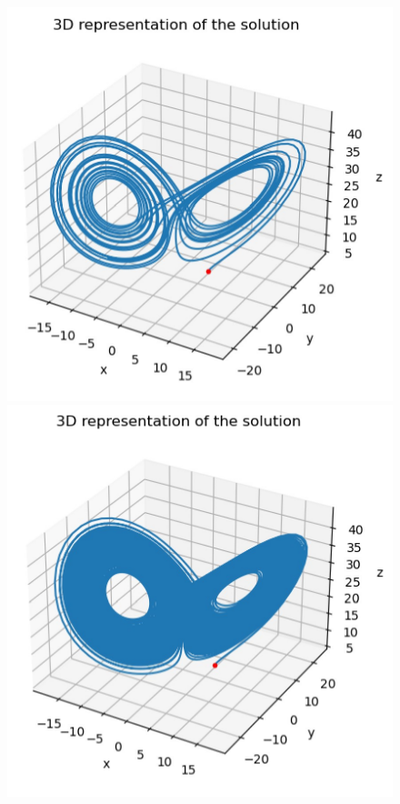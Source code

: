 \begin{figure}[H]       
	\begin{minipage}[t]{0.48\linewidth}
		\centering
		\includegraphics[width=\linewidth]{"images/parareal/lorenz_exact_3D.jpg"}
	\end{minipage} \hfill
	\begin{minipage}[t]{0.48\linewidth}
		\centering
		\includegraphics[width=\linewidth]{"images/parareal/lorenz_exact_3D_T200.jpg"}
	\end{minipage}
	\label{lorenz:exact3D}
\end{figure}

